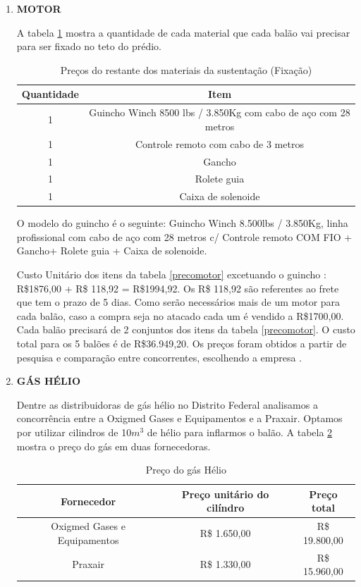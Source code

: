 \begin{enumerate}
		\hspace{1cm}

	\item \textbf{MOTOR}

		A tabela \ref{tab:precomotor} mostra a quantidade de cada material que cada balão vai precisar para ser fixado no teto do prédio.

		\begin{table}[htp]
			\centering
			\caption{Preços do restante dos materiais da sustentação (Fixação)}
			\begin{tabular}{ | c | c |}
				\hline
				\textbf{Quantidade} &\textbf{Item} \\ \hline
				1 &Guincho Winch 8500 lbs / 3.850Kg com cabo de aço com 28 metros \\ \hline
				1 &Controle remoto com cabo de 3 metros \\ \hline
				1 &Gancho\\ \hline
				1 &Rolete guia\\ \hline
				1 &Caixa de solenoide\\
				 \hline
			\end{tabular}
			\label{tab:precomotor}
		\end{table}

		O modelo do guincho é o seguinte: Guincho Winch 8.500lbs / 3.850Kg, linha profissional com cabo de aço com 28 metros c/ Controle remoto COM FIO + Gancho+ Rolete guia + Caixa de solenoide.

		Custo Unitário dos itens da tabela \ref{precomotor} excetuando o guincho : R\$1876,00 + R\$ 118,92 = R\$1994,92. Os R\$ 118,92 são referentes ao frete que tem o prazo de 5 dias. Como serão necessários mais de um motor para cada balão, caso a compra seja no atacado cada um é vendido a R\$1700,00. Cada balão precisará de 2 conjuntos dos itens da tabela \ref{precomotor}. O custo total para os 5 balões é de R\$36.949,20. Os preços foram obtidos a partir de pesquisa e comparação entre concorrentes, escolhendo a empresa \cite{precoMotor}.

		\hspace{2cm}
	\item  \textbf{GÁS HÉLIO}

		Dentre as distribuidoras de gás hélio no Distrito Federal analisamos a concorrência entre a Oxigmed Gases e Equipamentos e a Praxair. Optamos por utilizar cilindros de 10$m^3$ de hélio para inflarmos o balão. A tabela \ref{precogas} mostra o preço do gás em duas fornecedoras.

		\begin{table}[htp]
			\centering
			\caption{Preço do gás Hélio}
			\begin{tabular}{ | c | c | c |}
				\hline
				\textbf{Fornecedor} &\textbf{Preço unitário do cilíndro} &\textbf{Preço total}\\ \hline
				Oxigmed Gases e Equipamentos & R\$ 1.650,00 & R\$ 19.800,00 \\ \hline
				Praxair & R\$ 1.330,00 & R\$ 15.960,00 \\
				 \hline
			\end{tabular}
			\label{precogas}
		\end{table}


\end{enumerate}
